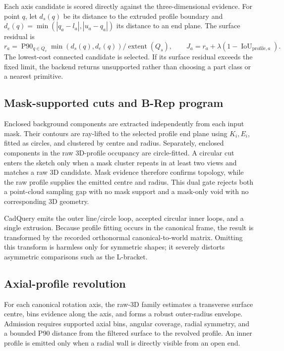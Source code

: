 \documentclass[10pt]{article}
\begin{document}
Each axis candidate is scored directly against the three-dimensional evidence.
For point $q$, let $d_s(q)$ be its distance to the extruded profile boundary and
$d_e(q)=\min(|q_a-l_a|,|u_a-q_a|)$ its distance to an end plane.  The surface
residual is
\begin{equation}
  r_a = \operatorname{P90}_{q\in Q_s}\min(d_s(q),d_e(q)) / \operatorname{extent}(Q_s),
  \qquad J_a = r_a + \lambda(1-\operatorname{IoU}_{\mathrm{profile},a}).
\end{equation}
The lowest-cost connected candidate is selected.  If its surface residual exceeds
the fixed limit, the backend returns unsupported rather than choosing a part
class or a nearest primitive.

\subsection{Mask-supported cuts and B-Rep program}

Enclosed background components are extracted independently from each input
mask.  Their contours are ray-lifted to the selected profile end plane using
$K_i,E_i$, fitted as circles, and clustered by centre and radius.  Separately,
enclosed components in the raw 3D-profile occupancy are circle-fitted.  A
circular cut enters the sketch only when a mask cluster repeats in at least two
views and matches a raw 3D candidate.  Mask evidence therefore confirms
topology, while the raw profile supplies the emitted centre and radius.  This
dual gate rejects both a point-cloud sampling gap with no mask support and a
mask-only void with no corresponding 3D geometry.

CadQuery emits the outer line/circle loop, accepted circular inner loops, and a
single extrusion.  Because profile fitting occurs in the canonical frame, the
result is transformed by the recorded orthonormal canonical-to-world matrix.
Omitting this transform is harmless only for symmetric shapes; it severely
distorts asymmetric comparisons such as the L-bracket.

\subsection{Axial-profile revolution}

For each canonical rotation axis, the raw-3D family estimates a transverse
surface centre, bins evidence along the axis, and forms a robust outer-radius
envelope.  Admission requires supported axial bins, angular coverage, radial
symmetry, and a bounded P90 distance from the filtered surface to the revolved
profile.  An inner profile is emitted only when a radial wall is directly visible
from an open end.
\end{document}
